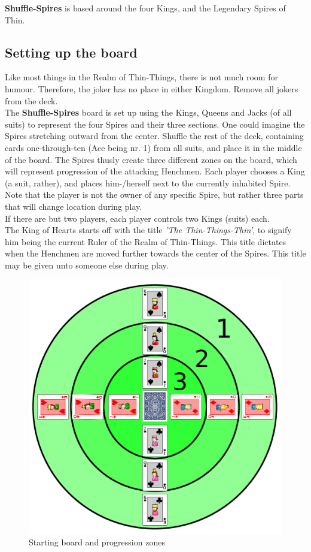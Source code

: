 \documentclass[11pt]{article} %
\begin{document}
\textbf{Shuffle-Spires} is based around the four Kings, and the Legendary Spires of Thin.

\subsection{Setting up the board}
Like most things in the Realm of Thin-Things, there is not much room for humour. Therefore, the joker has no place in either Kingdom. Remove all jokers from the deck.\\

\noindent
The \textbf{Shuffle-Spires} board is set up using the Kings, Queens and Jacks (of all suits) to represent the four Spires and their three sections. One could imagine the Spires stretching outward from the center. Shuffle the rest of the deck, containing cards one-through-ten (Ace being nr. 1) from all suits, and place it in the middle of the board.
The Spires thusly create three different zones on the board, which will represent progression of the attacking Henchmen.
Each player chooses a King (a suit, rather), and places him-/herself next to the currently inhabited Spire. Note that the player is not the owner of any specific Spire, but rather three parts that will change location during play. \\
If there are but two players, each player controls two Kings (suits) each. \\

\noindent
The King of Hearts starts off with the title \textit{'The Thin-Things-Thin'}, to signify him being the current Ruler of the Realm of Thin-Things. This title dictates when the Henchmen are moved further towards the center of the Spires. This title may be given unto someone else during play.

\begin{figure}[h!]
\centering
\includegraphics[scale=0.08]{starting.png}
\caption{Starting board and progression zones}
\label{starting}
\end{figure}
\end{document}

